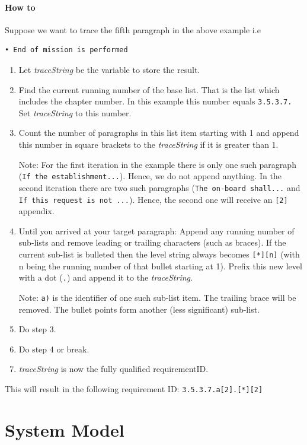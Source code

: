 \documentclass[11pt]{template/openetcs_report}
\begin{document}
\paragraph{How to}

Suppose we want to trace the fifth paragraph in the above example i.e
\begin{verbatim}
• End of mission is performed
\end{verbatim}
\begin{enumerate}
\item Let \textsl{traceString} be the variable to store the result.
\item Find the current running number of the base list. That is the list which
includes the chapter number. In this example this number equals
\verb+3.5.3.7.+ Set \textsl{traceString} to this number.
\item Count the number of paragraphs in this list item starting with 1 and append
this number in square brackets to the \textsl{traceString} if it is greater than 1.

Note: For the first iteration in the example there is only one such paragraph
(\texttt{If the establishment...}). Hence, we do not append anything. In the
second iteration there are two such paragraphs (\texttt{The on-board shall...} and
\texttt{If this request is not ...}). Hence, the second one will receive an
\texttt{[2]} appendix.

\item Until you arrived at your target paragraph: Append any running number of
sub-lists and remove leading or trailing characters (such as braces). If the
current sub-list is bulleted then the level string always becomes
\verb+[*][n]+ (with n being the running number of that bullet starting at
1). Prefix this new level with a dot (\verb+.+) and append it to the
\textsl{traceString}.

Note: \verb+a)+ is the identifier of one such sub-list item. The trailing brace
will be removed. The bullet points form another (less significant) sub-list.
\item Do step 3.
\item Do step 4 or break.
\item \textsl{traceString} is now the fully qualified requirementID.
\end{enumerate}

This will result in the following requirement ID: \quad \verb+3.5.3.7.a[2].[*][2]+



\section{System Model}
\label{sec-8}
\end{document}
